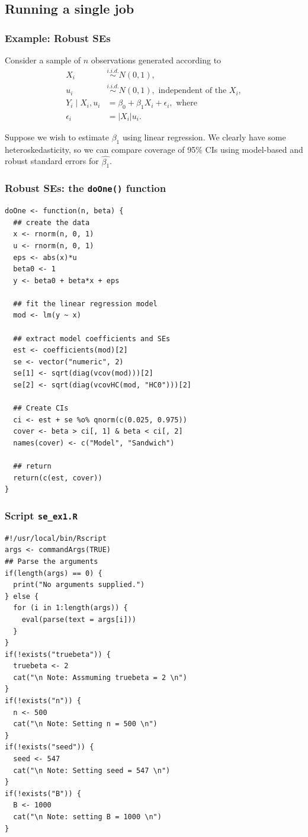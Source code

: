 \documentclass[12pt, 
hyperref={colorlinks=true, linkcolor=blue, urlcolor=cyan}]{beamer}
\newcommand{\abs}[1]{\left\lvert#1\right\rvert}
\begin{document}
\subsection{Running a single job}
\begin{frame}[fragile]
\frametitle{Example: Robust SEs}
Consider a sample of $n$ observations generated according to
\begin{align*}
X_i &\stackrel{i.i.d.}{\sim} N(0, 1), \\
u_i &\stackrel{i.i.d.}{\sim} N(0, 1), \text{ independent of the } X_i, \\
Y_i \mid X_i, u_i &= \beta_0 + \beta_1 X_i + \epsilon_i, \text{ where} \\
\epsilon_i &= \abs{X_i}u_i.
\end{align*}

Suppose we wish to estimate $\beta_1$ using linear regression. We clearly have some heteroskedasticity, so we can compare coverage of 95\% CIs using model-based and robust standard errors for $\hat{\beta_1}$.
\end{frame}

\begin{frame}[fragile]
\frametitle{Robust SEs: the \texttt{doOne()} function}
{\scriptsize
\begin{verbatim}
doOne <- function(n, beta) {
  ## create the data
  x <- rnorm(n, 0, 1)
  u <- rnorm(n, 0, 1)
  eps <- abs(x)*u
  beta0 <- 1
  y <- beta0 + beta*x + eps
  
  ## fit the linear regression model
  mod <- lm(y ~ x)
  
  ## extract model coefficients and SEs
  est <- coefficients(mod)[2]
  se <- vector("numeric", 2)
  se[1] <- sqrt(diag(vcov(mod)))[2]
  se[2] <- sqrt(diag(vcovHC(mod, "HC0")))[2]
  
  ## Create CIs
  ci <- est + se %o% qnorm(c(0.025, 0.975))
  cover <- beta > ci[, 1] & beta < ci[, 2]
  names(cover) <- c("Model", "Sandwich")
  
  ## return
  return(c(est, cover))
}
\end{verbatim}
}
\end{frame}

\begin{frame}[fragile]
\frametitle{Script \texttt{se\_ex1.R}}
{\scriptsize
\begin{verbatim}
#!/usr/local/bin/Rscript
args <- commandArgs(TRUE)
## Parse the arguments
if(length(args) == 0) {
  print("No arguments supplied.")
} else {
  for (i in 1:length(args)) {
    eval(parse(text = args[i]))
  }
}
if(!exists("truebeta")) {
  truebeta <- 2
  cat("\n Note: Assmuming truebeta = 2 \n")
}
if(!exists("n")) {
  n <- 500
  cat("\n Note: Setting n = 500 \n")
}
if(!exists("seed")) {
  seed <- 547
  cat("\n Note: Setting seed = 547 \n")
}
if(!exists("B")) {
  B <- 1000
  cat("\n Note: setting B = 1000 \n")
}
\end{verbatim}
}
\end{frame}
\end{document}
